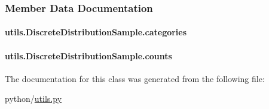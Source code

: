\subsubsection{Member Data Documentation}
\hypertarget{classutils_1_1DiscreteDistributionSample_afa78351d9f101acb84d2d2ad6bf71923}{
\paragraph[{categories}]{\setlength{\rightskip}{0pt plus 5cm}utils.\-Discrete\-Distribution\-Sample.\-categories}}\label{classutils_1_1DiscreteDistributionSample_afa78351d9f101acb84d2d2ad6bf71923}
\hypertarget{classutils_1_1DiscreteDistributionSample_a3521f264cfd39576b109fed45c45b5de}{
\paragraph[{counts}]{\setlength{\rightskip}{0pt plus 5cm}utils.\-Discrete\-Distribution\-Sample.\-counts}}\label{classutils_1_1DiscreteDistributionSample_a3521f264cfd39576b109fed45c45b5de}


The documentation for this class was generated from the following file\-:\begin{DoxyCompactItemize}
\item 
python/\hyperlink{utils_8py}{utils.\-py}\end{DoxyCompactItemize}

